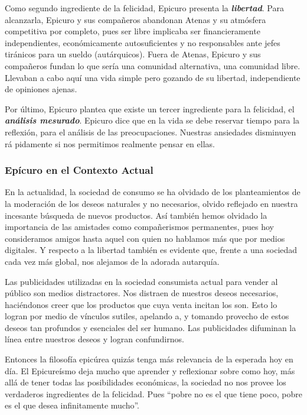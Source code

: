\documentclass{article}
\begin{document}
Como segundo ingrediente de la felicidad, Epicuro presenta la \textit{\textbf{libertad}}. Para alcanzarla, Epicuro y sus compañeros abandonan Atenas y su atmósfera competitiva por completo, pues ser libre implicaba ser financieramente independientes, económicamente autosuficientes y no responsables ante jefes tiránicos para un sueldo (autárquicos). Fuera de Atenas, Epicuro y sus compañeros fundan lo que sería una comunidad alternativa, una comunidad libre. Llevaban a cabo aquí una vida simple pero gozando de su libertad, independiente de opiniones ajenas.

Por último, Epicuro plantea que existe un tercer ingrediente para la felicidad, el \textit{\textbf{análisis mesurado}}. Epicuro dice que en la vida se debe reservar tiempo para la reflexión, para el análisis de las preocupaciones. Nuestras ansiedades disminuyen rá    pidamente si nos permitimos realmente pensar en ellas.

\subsubsection{Epícuro en el Contexto Actual}

En la actualidad, la sociedad de consumo se ha olvidado de los planteamientos de la moderación de los deseos naturales y no necesarios, olvido reflejado en nuestra incesante búsqueda de nuevos productos. Así también hemos olvidado la importancia de las amistades como compañerismos permanentes, pues hoy consideramos amigos hasta aquel con quien no hablamos más que por medios digitales. Y respecto a la libertad también es evidente que, frente a una sociedad cada vez más global, nos alejamos de la adorada autarquía.

Las publicidades utilizadas en la sociedad consumista actual para vender al público son medios distractores. Nos distraen de nuestros deseos necesarios, haciéndonos creer que los productos que cuya venta incitan los son. Esto lo logran por medio de vínculos sutiles, apelando a, y tomando provecho de estos deseos tan profundos y esenciales del ser humano. Las publicidades difuminan la línea entre nuestros deseos y logran confundirnos.

Entonces la filosofía epicúrea quizás tenga más relevancia de la esperada hoy en día. El Epicureísmo deja mucho que aprender y reflexionar sobre como hoy, más allá de tener todas las posibilidades económicas, la sociedad no nos provee los verdaderos ingredientes de la felicidad. Pues ``pobre no es el que tiene poco, pobre es el que desea infinitamente mucho''. 

\section{}
\end{document}

